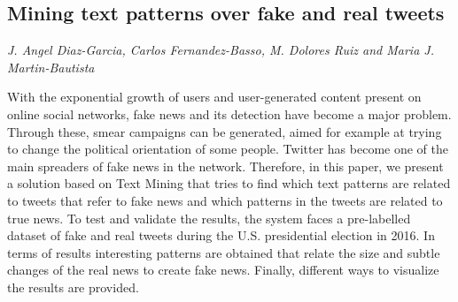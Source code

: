 \documentclass[../booklet.tex]{subfiles}
\begin{document}
\subsection[Mining text patterns over fake and real tweets. {\it J. Angel Diaz-Garcia, Carlos Fernandez-Basso, M. Dolores Ruiz and Maria J. Martin-Bautista}]{Mining text patterns over fake and real tweets}
   

\begin{center}
  {\it J. Angel Diaz-Garcia, Carlos Fernandez-Basso, M. Dolores Ruiz and Maria J. Martin-Bautista}
\end{center}



	
With the exponential growth of users and user-generated content present on online social networks, fake  news and its detection have become a major problem. Through these, smear campaigns can be generated, aimed for example at trying to change the political orientation of some people. Twitter has become one of the main spreaders of fake news in the network. Therefore, in this paper, we present a solution based on Text Mining that tries to find which text patterns are related to tweets that refer to fake news and which patterns in the tweets are related to true news. To test and validate the results, the system faces a pre-labelled dataset of fake and real tweets during the U.S. presidential election in 2016. In terms of results interesting patterns are obtained that relate the size and subtle changes of the real news to create fake news. Finally, different ways to visualize the results are provided. 	

\end{document}

